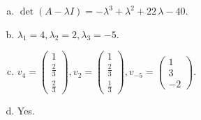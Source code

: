 \begin{questions}
\begin{solution}
\begin{enumerate}[(a)]
\item $\det(A-\lambda I)=-{\lambda}^{3} + {\lambda}^{2} + 22 \, {\lambda} - 40$.
\item ${\lambda}_1=4, {\lambda}_2=2, {\lambda}_3=-5$.
\item $v_{4}=\left(\begin{array}{r}
1 \\
\frac{2}{3} \\
\frac{2}{3}
\end{array}\right), v_{2}=\left(\begin{array}{r}
1 \\
\frac{2}{3} \\
\frac{1}{3}
\end{array}\right), v_{-5}=\left(\begin{array}{r}
1 \\
3 \\
-2
\end{array}\right)$.
\item Yes.
\end{enumerate}
\end{solution}

\end{questions}

\newpage


\begin{center}
\end{center}

